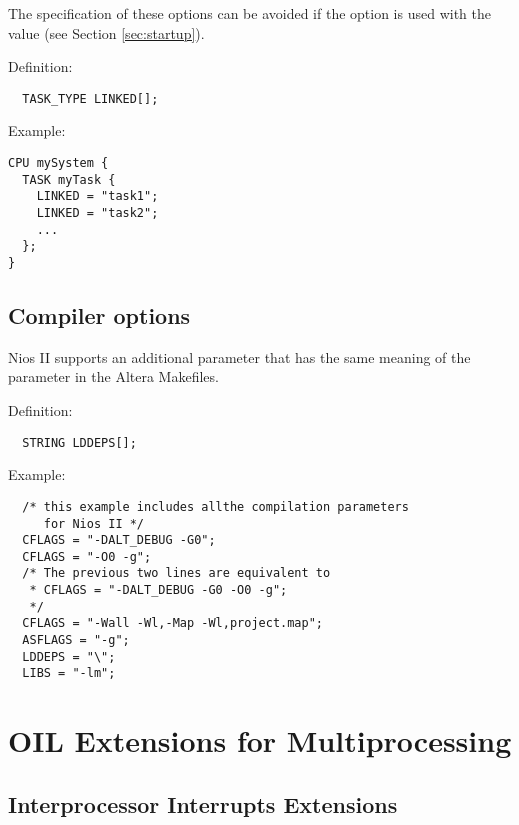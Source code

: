 \begin{warning}
  The specification of these options can be avoided if the option
   is used with the  value (see
  Section \ref{sec:startup}).
\end{warning}

Definition:

\begin{lstlisting}
  TASK_TYPE LINKED[];
\end{lstlisting}

Example:
\begin{lstlisting}
CPU mySystem {
  TASK myTask {
    LINKED = "task1";
    LINKED = "task2";
    ...
  };
}
\end{lstlisting}


\subsection{Compiler options}

Nios II supports an additional parameter  that has the
same meaning of the  parameter in the Altera Makefiles.

Definition:

\begin{lstlisting}
  STRING LDDEPS[];
\end{lstlisting}

Example:
\begin{lstlisting}
  /* this example includes allthe compilation parameters 
     for Nios II */
  CFLAGS = "-DALT_DEBUG -G0";
  CFLAGS = "-O0 -g";
  /* The previous two lines are equivalent to 
   * CFLAGS = "-DALT_DEBUG -G0 -O0 -g";
   */
  CFLAGS = "-Wall -Wl,-Map -Wl,project.map";
  ASFLAGS = "-g";
  LDDEPS = "\";
  LIBS = "-lm";
\end{lstlisting}

\section{OIL Extensions for Multiprocessing}

\subsection{Interprocessor Interrupts Extensions}

